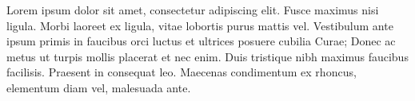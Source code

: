 Lorem ipsum dolor sit amet, consectetur adipiscing elit. Fusce maximus nisi ligula. Morbi laoreet ex ligula, vitae lobortis purus mattis vel. Vestibulum ante ipsum primis in faucibus orci luctus et ultrices posuere cubilia Curae; Donec ac metus ut turpis mollis placerat et nec enim. Duis tristique nibh maximus faucibus facilisis. Praesent in consequat leo. Maecenas condimentum ex rhoncus, elementum diam vel, malesuada ante.
